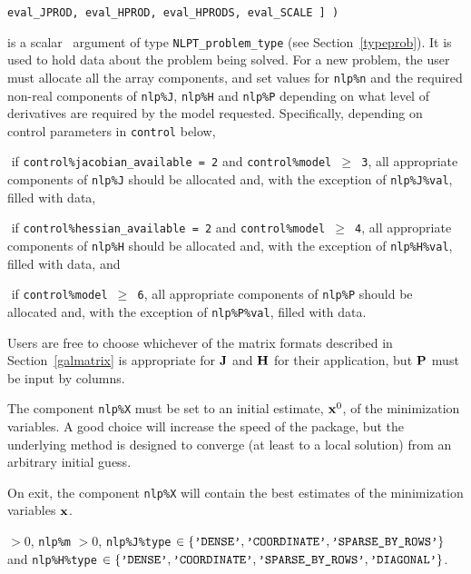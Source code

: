 \documentclass{galahad}
\begin{document}
\hspace{37mm}
{\tt eval\_JPROD,  eval\_HPROD, eval\_HPRODS, eval\_SCALE ] )}

\vspace*{-2mm}
\begin{description}
 is a scalar \intentinout\ argument of type
{\tt NLPT\_problem\_type}
(see Section~\ref{typeprob}).
It is used to hold data about the problem being solved.
For a new problem, the user must allocate all the array components,
and set values for {\tt nlp\%n}
and the required non-real components of
{\tt nlp\%J}, {\tt nlp\%H} and {\tt nlp\%P} depending on what level
of derivatives are required by the model requested. Specifically,
depending on control parameters in {\tt control} below,
\vspace*{-2mm}
\begin{description}
\item $\mbox{}$ if {\tt control\%jacobian\_available = 2} and
{\tt control\%model $\geq$ 3}, all appropriate components of
 {\tt nlp\%J} should be allocated and, with the exception of {\tt nlp\%J\%val},
filled with data,
\item $\mbox{}$ if {\tt control\%hessian\_available = 2} and
{\tt control\%model $\geq$ 4}, all appropriate components of
 {\tt nlp\%H} should be allocated and, with the exception of {\tt nlp\%H\%val},
filled with data, and
\item $\mbox{}$ if {\tt control\%model $\geq$ 6}, all appropriate
 components of {\tt nlp\%P} should be allocated and, with the exception
 of {\tt nlp\%P\%val}, filled with data.
\end{description}
Users are free to choose whichever
of the matrix formats described in Section~\ref{galmatrix}
is appropriate for ${\mathbf{J}}$ and ${\mathbf{H}}$ for their application,
but ${\mathbf{P}}$ must be input by columns.

\noindent
The component {\tt nlp\%X} must be set to an initial estimate, ${\mathbf{x}}^{0}$,
of the minimization variables. A good choice will increase the speed
of the package, but the underlying method is designed to converge (at least
to a local solution) from an arbitrary initial guess.

\noindent
On exit, the component {\tt nlp\%X} will contain the best estimates of the
minimization variables ${\mathbf{x}}$.

\noindent
{} $> 0$, {\tt nlp\%m} $> 0$,
{\tt nlp\%J\%type} $\in \{
  \mbox{\tt 'DENSE'}, \mbox{\tt 'COORDINATE'}, \mbox{\tt 'SPARSE\_BY\_ROWS'}
 \}$ and
{\tt nlp\%H\%type} $\in \{
  \mbox{\tt 'DENSE'}, \mbox{\tt 'COORDINATE'}, \mbox{\tt 'SPARSE\_BY\_ROWS'},
  \mbox{\tt 'DIAGONAL'} \}$.


\end{description}
\end{document}
